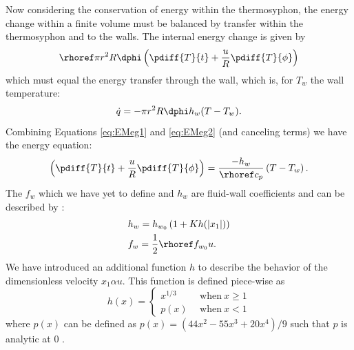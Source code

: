 Now considering the conservation of energy within the thermosyphon, the energy change within a finite volume must be balanced by transfer within the thermosyphon and to the walls.
The internal energy change is given by
\begin{equation} \rhoref \pi r^2 R \dphi \left ( \pdiff{T}{t} + \frac{u}{R}\pdiff{T}{\phi} \right ) \label{eq:EMeg1}\end{equation}
which must equal the energy transfer through the wall, which is, for $T_w$ the wall temperature:
\begin{equation} \dot{q} = -\pi r^2 R \dphi h_w (T - T_w) . \label{eq:EMeg2} \end{equation}
Combining Equations \ref{eq:EMeg1} and \ref{eq:EMeg2} (and canceling terms) we have the energy equation:
\begin{equation} \left ( \pdiff{T}{t} + \frac{u}{R}\pdiff{T}{\phi} \right ) = \frac{-h_w}{\rhoref c_p} \left( T - T_w \right ) \label{eq:EMeq}.\end{equation}
The $f_w$ which we have yet to define and $h_w$ are fluid-wall coefficients and can be described by :
\begin{align*} & h_w = h_{w_0} \left ( 1 + K h(|x_1|) \right ) \\
& f_w = \frac{1}{2} \rhoref f_{w_0} u .\end{align*}
We have introduced an additional function $h$ to describe the behavior of the dimensionless velocity $x_1 \alpha u$.
This function is defined piece-wise as 
\begin{equation*} h (x) = \left \{ \begin{array}{ll} x^{1/3} & ~~\text{when} ~x \geq 1\\ p (x) & ~~\text{when} ~ x <1 \end{array} \right. \end{equation*} 
where $p(x)$ can be defined as $p(x) = \left( 44x^2 -55 x^3 + 20x^4 \right ) /9$ such that $p$ is analytic at 0 .

